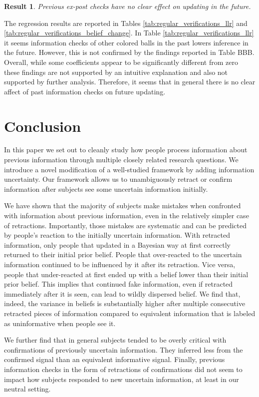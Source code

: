 \documentclass{article}
\newtheorem{result}{Result}
\newenvironment{Result}{\begin{result} \rm }{\end{result}}
\begin{document}
\begin{Result}
Previous ex-post checks have no clear effect on updating in the future.
\end{Result}

The regression results are reported in Tables \ref{tab:regular_verifications_llr} and \ref{tab:regular_verifications_belief_change}. In Table \ref{tab:regular_verifications_llr} it seems information checks of other colored balls in the past lowers inference in the future. However, this is not confirmed by the findings reported in Table BBB. Overall, while some coefficients appear to be significantly different from zero these findings are not supported by an intuitive explanation and also not supported by further analysis. Therefore, it seems that in general there is no clear affect of past information checks on future updating.


\section{Conclusion}
In this paper we set out to cleanly study how people process information about previous information through multiple closely related research questions. We introduce a novel modification of a well-studied framework by adding information uncertainty. Our framework allows us to unambiguously retract or confirm information after subjects see some uncertain information initially.

We have shown that the majority of subjects make mistakes when confronted with information about previous information, even in the relatively simpler case of retractions. Importantly, those mistakes are systematic and can be predicted by people's reaction to the initially uncertain information. With retracted information, only people that updated in a Bayesian way at first correctly returned to their initial prior belief. People that over-reacted to the uncertain information continued to be influenced by it after its retraction. Vice versa, people that under-reacted at first ended up with a belief lower than their initial prior belief. This implies that continued fake information, even if retracted immediately after it is seen, can lead to wildly dispersed belief. We find that, indeed, the variance in beliefs is substantially higher after multiple consecutive retracted pieces of information compared to equivalent information that is labeled as uninformative when people see it. 

We further find that in general subjects tended to be overly critical with confirmations of previously uncertain information. They inferred less from the confirmed signal than an equivalent informative signal. Finally, previous information checks in the form of retractions of confirmations did not seem to impact how subjects responded to new uncertain information, at least in our neutral setting.
\end{document}
